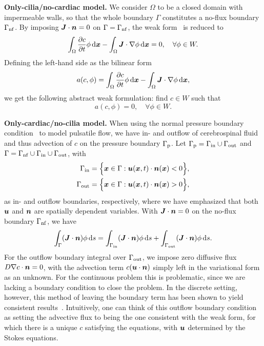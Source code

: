 \documentclass{WileyMSP-template}
\begin{document}
\textbf{Only-cilia/no-cardiac model.} We consider $\Omega$ to be
a closed domain with impermeable walls, so that the whole boundary
$\Gamma$ constitutes a no-flux boundary $\Gamma_{\mathrm{nf}}$.
By imposing $\bm{J}\cdot\bm{n}=0$ on $\Gamma=\Gamma_{\mathrm{nf}}$, 
the weak form~ is reduced to
\begin{equation*}
    \int_{\Omega}\frac{\partial c}{\partial t}\phi \, \mathrm d\bm{x} - \int_{\Omega}\bm{J}\cdot\nabla\phi \, \mathrm d\bm{x} = 0, \quad\forall\phi\in W.
\end{equation*}
Defining the left-hand side as the bilinear form
\begin{equation*}
    a(c, \phi) = \int_{\Omega}\frac{\partial c}{\partial t}\phi \, \mathrm d\bm{x} - \int_{\Omega}\bm{J}\cdot\nabla\phi \, \mathrm d\bm{x}, 
\end{equation*}
we get the following abstract weak formulation: find $c\in W$ such that
\begin{equation*}
    a(c, \phi) = 0, \quad\forall\phi\in W.
\end{equation*}

\textbf{Only-cardiac/no-cilia model.} When using the normal pressure
boundary condition~ to model pulsatile flow,
we have in- and outflow of cerebrospinal fluid and thus advection of
$c$ on the pressure boundary $\Gamma_{\mathrm{p}}$.
Let $\Gamma_{\mathrm{p}}=\Gamma_{\mathrm{in}}\cup\Gamma_{\mathrm{out}}$ and $\Gamma = \Gamma_{\mathrm{nf}}\cup\Gamma_{\mathrm{in}}\cup\Gamma_{\mathrm{out}}$, with 
\begin{align*}
    \Gamma_{\mathrm{in}}  &= \Big\{\bm{x}\in\Gamma : \bm{u}(\bm{x}, t)\cdot\bm{n}(\bm{x}) < 0 \Big\}, \\
    \Gamma_{\mathrm{out}} &= \Big\{\bm{x}\in\Gamma : \bm{u}(\bm{x}, t)\cdot\bm{n}(\bm{x}) > 0 \Big\},
\end{align*}
as in- and outflow boundaries, respectively, where we have emphasized that
both $\bm{u}$ and $\bm{n}$ are spatially dependent variables.
With $\bm{J}\cdot\bm{n}=0$ on the no-flux boundary $\Gamma_{\mathrm{nf}}$, we have
\begin{equation*}
    \int_{\Gamma}(\bm{J}\cdot\bm{n})\phi \, \mathrm ds = \int_{\Gamma_{\mathrm{in}}}(\bm{J}\cdot\bm{n})\phi \, \mathrm ds + \int_{\Gamma_{\mathrm{out}}}(\bm{J}\cdot\bm{n})\phi \, \mathrm ds. 
\end{equation*}
For the outflow boundary integral over $\Gamma_{\mathrm{out}}$, we impose zero
diffusive flux $D\nabla c\cdot\bm{n}=0$,
with the advection term $c(\bm{u}\cdot\bm{n})$ simply left in the variational form as an unknown.
For the continuous problem this is problematic, since we are lacking a boundary
condition to close the problem. 
In the discrete setting, however, this method of leaving the boundary term has been shown
to yield consistent results~\cite{Papanastasiou1992ACondition, Lynch2020NumericalHemodynamics,
Griffiths1997TheCondition}. Intuitively, one can think of this outflow boundary condition as
setting the advective flux to being the one consistent with the weak form,
for which there is a unique $c$ satisfying the equations, with $\bm{u}$ determined by
the Stokes equations. 
\end{document}
